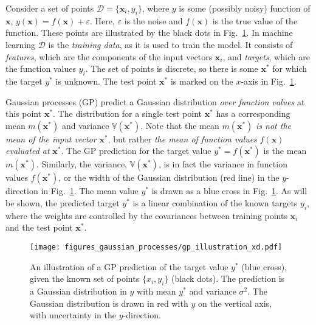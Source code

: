 \documentclass[twoside,english]{uiofysmaster}
\begin{document}
Consider a set of points $\mathcal{D} = \{\textbf{x}_i, y_i\}$, where $y$ is some (possibly noisy) function of $\textbf{x}$, $y(\textbf{x}) = f(\textbf{x}) + \varepsilon$. Here, $\varepsilon$ is the noise and $f(\textbf{x})$ is the true value of the function. These points are illustrated by the black dots in Fig.~\ref{Fig:: gaussian process : GP illustration}. In machine learning $\mathcal{D}$ is the \textit{training data}, as it is used to train the model. It consists of \textit{features}, which are the components of the input vectors $\textbf{x}_i$, and \textit{targets}, which are the function values $y_i$. The set of points is discrete, so there is some $\textbf{x}^*$ for which the target $y^*$ is unknown. The test point $\textbf{x}^*$ is marked on the $x$-axis in Fig.~\ref{Fig:: gaussian process : GP illustration}.

Gaussian processes (GP) predict a Gaussian distribution \textit{over function values} at this point $\textbf{x}^*$. The distribution for a single test point $\textbf{x}^*$ has a corresponding mean $m(\textbf{x}^*)$ and variance $\mathbb{V}(\textbf{x}^*)$. Note that the mean $m(\textbf{x}^*)$ \textit{is not the mean of the input vector} $\textbf{x}^*$, but rather \textit{the mean of function values} $f(\textbf{x})$ \textit{evaluated at} $\textbf{x}^*$. The GP prediction for the target value $y^*=f(\textbf{x}^*)$ is the mean $m(\textbf{x}^*)$. Similarly, the variance, $\mathbb{V}(\textbf{x}^*)$, is in fact the variance in function values $f(\textbf{x}^*)$, or the width of the Gaussian distribution (red line) in the $y$-direction in Fig.~\ref{Fig:: gaussian process : GP illustration}. The mean value $y^*$ is drawn as a blue cross in Fig.~\ref{Fig:: gaussian process : GP illustration}. As will be shown, the predicted target $y^*$ is a linear combination of the known targets $y_i$, where the weights are controlled by the covariances between training points $\textbf{x}_i$ and the test point $\textbf{x}^*$.  


\begin{figure}
\centering
\texttt{[image: figures\_gaussian\_processes/gp\_illustration\_xd.pdf]}
\caption{An illustration of a GP prediction of the target value $y^*$ (blue cross), given the known set of points $\{x_i, y_i\}$ (black dots). The prediction is a Gaussian distribution in $y$ with mean $y^*$ and variance $\sigma^2$. The Gaussian distribution is drawn in red with $y$ on the vertical axis, with uncertainty in the $y$-direction.}
\label{Fig:: gaussian process : GP illustration}
\end{figure}
\end{document}
